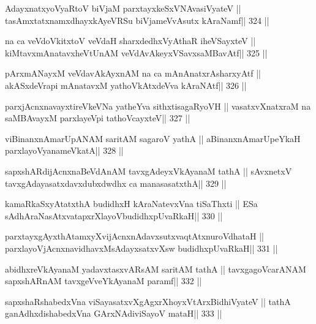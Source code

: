 \begin{shl}
AdayxnatxyoVyaRtoV biVjaM parxtayxkeSxVNAvasiVyateV ||
tasAmxtatxnamxdhayxkAyeVRSu biVjameVvAsutx kAraNamf\hfill || 324 ||
\end{shl}

\begin{shl}
na ca veVdoVkitxtoV veVdaH sharxdedhxVyAthaR iheVSayxteV ||
kiMtavxmAnatavxheVtUnAM veVdAvAkeyxVSavxsaMBavAtf\hfill || 325 ||
\end{shl}

\begin{shl}
pArxmANayxM veVdavAkAyxnAM na ca mAnAnatxrAsharxyAtf ||
akASxdeVrapi mAnatavxM yathoVkAtxdeVva kAraNAtf\hfill || 326 ||
\end{shl}

\begin{shl}
parxjAcnxnavayxtireVkeVNa yatheYva sithxtisagaRyoVH ||
vasatxvXnatxraM na saMBAvayxM parxlayeV\s pi tathoVcayxteV\hfill || 327 ||
\end{shl}

\begin{shl}
viBinanxnAmarUpANAM saritAM sagaroV yathA ||
aBinanxnAmarUpeYkaH parxlayoV\s yanameVkatA\hfill || 328 ||
\end{shl}

\begin{shl}
sapxshARdijAcnxnaBeVdAnAM tavxgAdeyxVkAyanaM tathA ||
sAvxnetxV tavxgAdayasatxdavxdubxdwdhx ca manasasatxthA\hfill || 329 ||
\end{shl}

\begin{shl}
kamaRkaSxyAtatxthA budidhxH kAraNatevxVna tiSaThxti ||
ESa sAdhAraNasAtxvatapxrXlayoV\s budidhxpUvaRkaH\hfill || 330 ||
\end{shl}

\begin{shl}
parxtayxgAyxthAtamxyXvijAcnxnAdavxsutxvaqtAtxnuroVdhataH ||
parxlayoV\s jAcnxnavidhavxMsAdayxsatxvXsw budidhxpUvaRkaH\hfill || 331 ||
\end{shl}

\begin{shl}
abidhxreVkAyanaM yadavxtasxvARsAM saritAM tathA ||
tavxgagoVcarANAM sapxshARnAM tavxgeVveYkAyanaM paramf\hfill || 332 ||
\end{shl}

\begin{shl}
sapxshaRshabedxVna viSayasatxvXgAgxrXhoyxV\s tArxBidhiVyateV ||
tathA ganAdhxdishabedxVna GArxNAdiviSayoV mataH\hfill || 333 ||
\end{shl}

